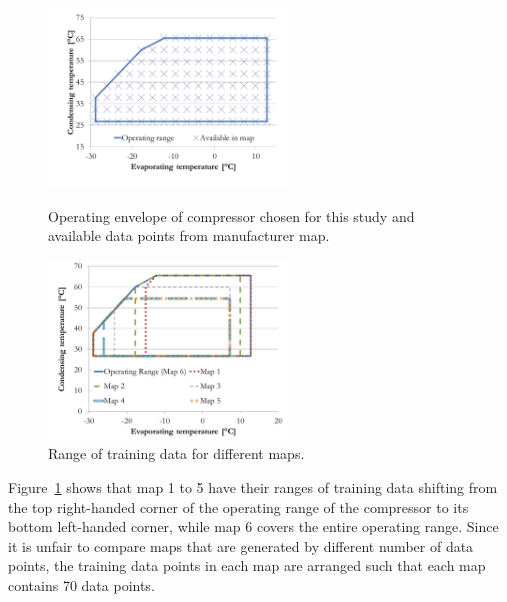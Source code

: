 \begin{figure}[h]
\begin{minipage}{15pc}
\includegraphics[width=15pc]{./fig/operating_envelope.pdf}
\caption{\label{fig:oper_envelope}Operating envelope of compressor chosen for this study and available data points from manufacturer map.}
\end{minipage}\hspace{2pc}%
\begin{minipage}{15pc}
\includegraphics[width=15pc]{./fig/training_data_sets.pdf}
\caption{\label{fig:training_envelope} Range of training data for different maps. }
\end{minipage} 
\end{figure}

Figure~\ref{fig:training_envelope} shows that map 1 to 5 have their ranges of training data shifting from the top right-handed corner of the operating range of the compressor to its bottom left-handed corner, while map 6 covers the entire operating range. Since it is unfair to compare maps that are generated by different number of data points, the training data points in each map are arranged such that each map contains 70 data points.